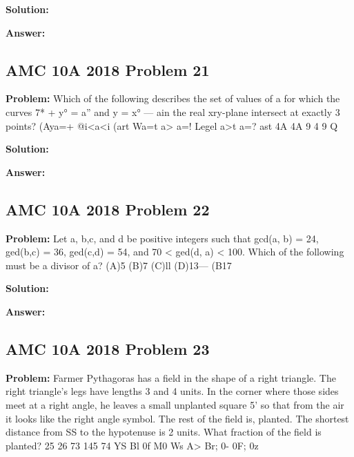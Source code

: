 \documentclass{article}
\newenvironment{problem}{\textbf{Problem: }}{\\}
\newenvironment{solution}{\textbf{Solution: }}{\\}
\newenvironment{answer}{\textbf{Answer: }}{\\}
\begin{document}
\begin{solution}
\end{solution}

\begin{answer}
\end{answer}

\subsection{AMC 10A 2018 Problem 21}

\begin{problem}
Which of the following describes the set of values of a for which the curves 7* + y° = a” and y = x° — ain the real xry-plane intersect at exactly 3 points? (Aya=+ @i<a<i (art Wa=t a>} a=! Legel a>t a=? ast 4A 4A 9 4 9 Q
\end{problem}

\begin{solution}
\end{solution}

\begin{answer}
\end{answer}

\subsection{AMC 10A 2018 Problem 22}

\begin{problem}
Let a, b,c, and d be positive integers such that gcd(a, b) = 24, ged(b,c) = 36, ged(c,d) = 54, and 70 < ged(d, a) < 100. Which of the following must be a divisor of a? (A)5 (B)7 (C)ll (D)13— (B17
\end{problem}

\begin{solution}
\end{solution}

\begin{answer}
\end{answer}

\subsection{AMC 10A 2018 Problem 23}

\begin{problem}
Farmer Pythagoras has a field in the shape of a right triangle. The right triangle’s legs have lengths 3 and 4 units. In the corner where those sides meet at a right angle, he leaves a small unplanted square 5’ so that from the air it looks like the right angle symbol. The rest of the field is, planted. The shortest distance from SS to the hypotenuse is 2 units. What fraction of the field is planted? 25 26 73 145 74 YS Bl 0f M0 Ws A> Br; 0- 0F; 0z
\end{problem}
\end{document}
